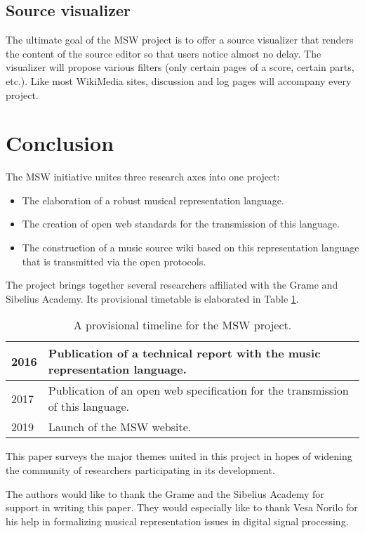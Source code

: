 \documentclass{article}
\begin{document}
\subsection{Source visualizer}
The ultimate goal of the MSW project is to offer a source visualizer that
renders the content of the source editor so that users notice almost no
delay. The visualizer will propose various filters (only certain pages of a
score, certain parts, etc.). Like most WikiMedia sites,
discussion and log pages will accompany every project.
\section{Conclusion}\label{sec:conclusion}
The MSW initiative unites three research axes into one project:
\begin{itemize}
\item The elaboration of a robust musical representation language.
\item The creation of open web standards for the transmission of this
language.
\item The construction of a music source wiki based on this representation
language that is transmitted via the open protocols.
\end{itemize}
The project brings together several researchers affiliated with the Grame
and Sibelius Academy.  Its provisional timetable is elaborated in Table
\ref{tab:timeline}.
\begin{table}[h]
\begin{center}
\begin{tabular}{|l|p{6cm}|}\hline
2016 & Publication of a technical report with the music representation
language. \\\hline
2017 & Publication of an open web specification for the transmission of this
language. \\\hline
2019 & Launch of the MSW website. \\\hline
\end{tabular}
\end{center}
 \caption{A provisional timeline for the MSW project.}
 \label{tab:timeline}
\end{table}
This paper surveys the major themes united in this project in hopes of
widening the community of researchers participating in its development.
\begin{acknowledgments}
The authors would like to thank the Grame and the Sibelius Academy for
support in writing this paper. They would especially like to thank Vesa
Norilo for his help in formalizing musical representation issues in
digital signal processing.
\end{acknowledgments} 


\end{document}
